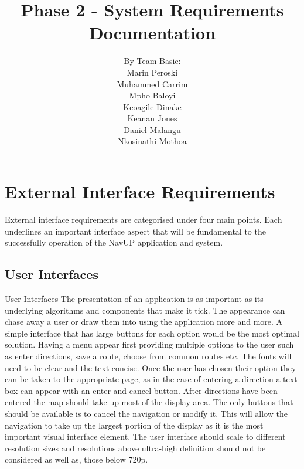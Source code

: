 \documentclass[11pt]{article}
\begin{document}
\title{Phase 2 - System Requirements Documentation} 
\author{By Team Basic: \\ Marin Peroski \\ Muhammed Carrim \\ Mpho Baloyi \\ Keoagile Dinake \\ Keanan  Jones \\ Daniel Malangu \\ Nkosinathi Mothoa}
\maketitle
\newpage
\tableofcontents
\newpage

\section{External Interface Requirements}

External interface requirements are categorised under four main points. Each underlines an important interface aspect that will be fundamental to the successfully operation of the NavUP application and system. 

\subsection{User Interfaces}
User Interfaces
The presentation of an application is as important as its underlying algorithms and components that make it tick. The appearance can chase away a user or draw them into using the application more and more. A simple interface that has large buttons for each option would be the most optimal solution. Having a menu appear first providing multiple options to the user such as enter directions, save a route, choose from common routes etc. The fonts will need to be clear and the text concise. Once the user has chosen their option they can be taken to the appropriate page, as in the case of entering a direction a text box can appear with an enter and cancel button. After directions have been entered the map should take up most of the display area. The only buttons that should be available is to cancel the navigation or modify it. This will allow the navigation to take up the largest portion of the display as it is the most important visual interface element. 
The user interface should scale to different resolution sizes and resolutions above ultra-high definition should not be considered as well as, those below 720p. 
\end{document}
